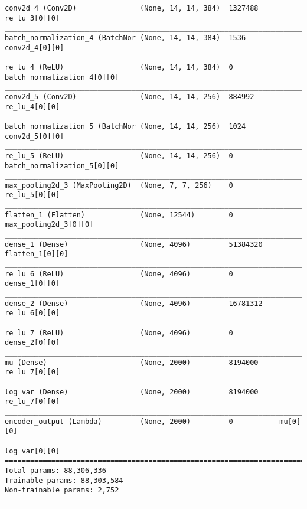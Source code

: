 \begin{lstlisting}[caption={AlexNet \ac{VAE} Encoder},captionpos=b,basicstyle=\tiny, label={lst:alexnet-vae-encoder}]
conv2d_4 (Conv2D)               (None, 14, 14, 384)  1327488     re_lu_3[0][0]
__________________________________________________________________________________________________
batch_normalization_4 (BatchNor (None, 14, 14, 384)  1536        conv2d_4[0][0]
__________________________________________________________________________________________________
re_lu_4 (ReLU)                  (None, 14, 14, 384)  0           batch_normalization_4[0][0]
__________________________________________________________________________________________________
conv2d_5 (Conv2D)               (None, 14, 14, 256)  884992      re_lu_4[0][0]
__________________________________________________________________________________________________
batch_normalization_5 (BatchNor (None, 14, 14, 256)  1024        conv2d_5[0][0]
__________________________________________________________________________________________________
re_lu_5 (ReLU)                  (None, 14, 14, 256)  0           batch_normalization_5[0][0]
__________________________________________________________________________________________________
max_pooling2d_3 (MaxPooling2D)  (None, 7, 7, 256)    0           re_lu_5[0][0]
__________________________________________________________________________________________________
flatten_1 (Flatten)             (None, 12544)        0           max_pooling2d_3[0][0]
__________________________________________________________________________________________________
dense_1 (Dense)                 (None, 4096)         51384320    flatten_1[0][0]
__________________________________________________________________________________________________
re_lu_6 (ReLU)                  (None, 4096)         0           dense_1[0][0]
__________________________________________________________________________________________________
dense_2 (Dense)                 (None, 4096)         16781312    re_lu_6[0][0]
__________________________________________________________________________________________________
re_lu_7 (ReLU)                  (None, 4096)         0           dense_2[0][0]
__________________________________________________________________________________________________
mu (Dense)                      (None, 2000)         8194000     re_lu_7[0][0]
__________________________________________________________________________________________________
log_var (Dense)                 (None, 2000)         8194000     re_lu_7[0][0]
__________________________________________________________________________________________________
encoder_output (Lambda)         (None, 2000)         0           mu[0][0]
                                                                 log_var[0][0]
==================================================================================================
Total params: 88,306,336
Trainable params: 88,303,584
Non-trainable params: 2,752
__________________________________________________________________________________________________
\end{lstlisting}